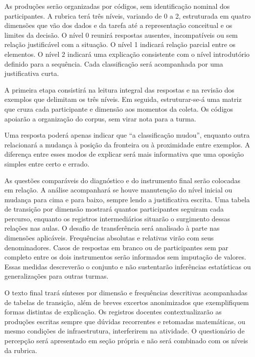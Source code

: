 As produções serão organizadas por códigos, sem identificação nominal dos participantes. A rubrica terá três níveis, variando de 0 a 2, estruturada em quatro dimensões que vão dos dados e da tarefa até a representação conceitual e os limites da decisão. O nível 0 reunirá respostas ausentes, incompatíveis ou sem relação justificável com a situação. O nível 1 indicará relação parcial entre os elementos. O nível 2 indicará uma explicação consistente com o nível introdutório definido para a sequência. Cada classificação será acompanhada por uma justificativa curta.

A primeira etapa consistirá na leitura integral das respostas e na revisão dos exemplos que delimitam os três níveis. Em seguida, estruturar-se-á uma matriz que cruza cada participante e dimensão aos momentos da coleta. Os códigos apoiarão a organização do corpus, sem virar nota para a turma.

Uma resposta poderá apenas indicar que ``a classificação mudou'', enquanto outra relacionará a mudança à posição da fronteira ou à proximidade entre exemplos. A diferença entre esses modos de explicar será mais informativa que uma oposição simples entre certo e errado.

As questões comparáveis do diagnóstico e do instrumento final serão colocadas em relação. A análise acompanhará se houve manutenção do nível inicial ou mudança para cima e para baixo, sempre lendo a justificativa escrita. Uma tabela de transição por dimensão mostrará quantos participantes seguiram cada percurso, enquanto os registros intermediários situarão o surgimento dessas relações nas aulas. O desafio de transferência será analisado à parte nas dimensões aplicáveis. Frequências absolutas e relativas virão com seus denominadores. Casos de respostas em branco ou de participantes sem par completo entre os dois instrumentos serão informados sem imputação de valores. Essas medidas descreverão o conjunto e não sustentarão inferências estatísticas ou generalizações para outras turmas.

O texto final trará sínteses por dimensão e frequências descritivas acompanhadas de tabelas de transição, além de breves excertos anonimizados que exemplifiquem formas distintas de explicação. Os registros docentes contextualizarão as produções escritas sempre que dúvidas recorrentes e retomadas matemáticas, ou mesmo condições de infraestrutura, interferirem na atividade. O questionário de percepção será apresentado em seção própria e não será combinado com os níveis da rubrica.

